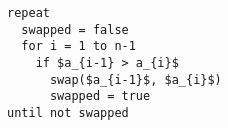 \begin{lstlisting}[style = code]
repeat
  swapped = false
  for i = 1 to n-1
    if $a_{i-1} > a_{i}$
      swap($a_{i-1}$, $a_{i}$)
      swapped = true
until not swapped
\end{lstlisting}

